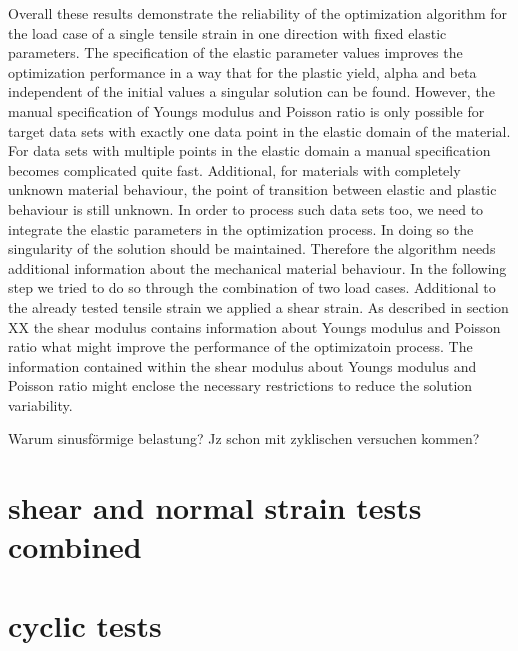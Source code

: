     Overall these results demonstrate the reliability of the optimization algorithm for the load case of a single tensile strain in one direction with fixed elastic parameters. The specification of the elastic parameter values improves the optimization performance in a way that for the plastic yield, alpha and beta independent of the initial values a singular solution can be found. However, the manual specification of Youngs modulus and Poisson ratio is only possible for target data sets with exactly one data point in the elastic domain of the material. For data sets with multiple points in the elastic domain a manual specification becomes complicated quite fast. Additional, for materials with completely unknown material behaviour, the point of transition between elastic and plastic behaviour is still unknown. In order to process such data sets too, we need to integrate the elastic parameters in the optimization process. In doing so the singularity of the solution should be maintained. Therefore the algorithm needs additional information about the mechanical material behaviour. In the following step we tried to do so through the combination of two load cases. Additional to the already tested tensile strain we applied a shear strain. As described in section XX the shear modulus contains information about Youngs modulus and  Poisson ratio what might improve the performance of the optimizatoin process. The information contained within the shear modulus about Youngs modulus and Poisson ratio might enclose the necessary restrictions to reduce the solution variability. 
    
    Warum sinusförmige belastung? Jz schon mit zyklischen versuchen kommen?
    

    \section{shear and normal strain tests combined}
    \section{cyclic tests}







	